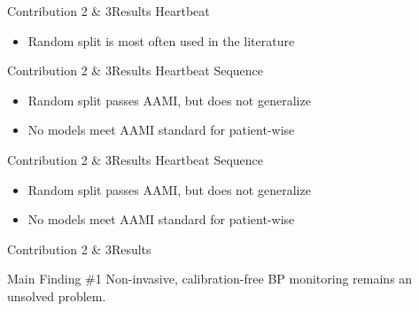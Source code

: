 \begin{frame}{Contribution 2 \& 3}{Results}
    \centering
    Heartbeat
    \begin{figure}
        
        \hfill
        
    \end{figure}
    \begin{itemize}
        \item Random split is most often used in the literature
    \end{itemize}
\end{frame}


\begin{frame}{Contribution 2 \& 3}{Results}
    \centering
    Heartbeat Sequence
    \begin{figure}
        
        \hfill
        
    \end{figure}
    \begin{itemize}
        \item Random split passes AAMI, but does not generalize
        \item No models meet AAMI standard for patient-wise
    \end{itemize}
\end{frame}

\begin{frame}{Contribution 2 \& 3}{Results}
    \centering
    Heartbeat Sequence
    \begin{figure}
        
        \hfill
        
    \end{figure}
    \begin{itemize}
        \item Random split passes AAMI, but does not generalize
        \item No models meet AAMI standard for patient-wise
    \end{itemize}
\end{frame}

\begin{frame}{Contribution 2 \& 3}{Results}
    \begin{block}{Main Finding \#1}
        Non-invasive, calibration-free BP monitoring remains an unsolved problem.
    \end{block}
\end{frame}

